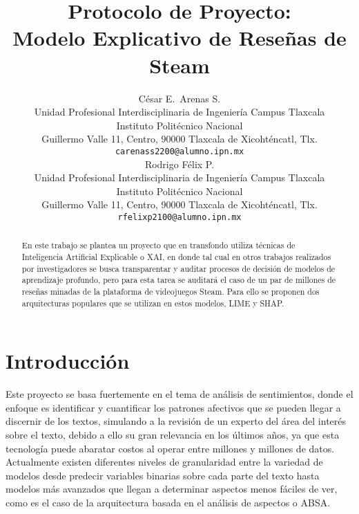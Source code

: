 \documentclass{article}
\title{Protocolo de Proyecto: \\ Modelo Explicativo de Reseñas de Steam}
\author{
  César E.~Arenas S. \\
  Unidad Profesional Interdisciplinaria de Ingeniería Campus Tlaxcala\\
  Instituto Politécnico Nacional\\
  Guillermo Valle 11, Centro, 90000 Tlaxcala de Xicohténcatl, Tlx. \\
  \texttt{carenass2200@alumno.ipn.mx} \\
  \And
  Rodrigo Félix P. \\
  Unidad Profesional Interdisciplinaria de Ingeniería Campus Tlaxcala\\
  Instituto Politécnico Nacional \\
  Guillermo Valle 11, Centro, 90000 Tlaxcala de Xicohténcatl, Tlx. \\
  \texttt{rfelixp2100@alumno.ipn.mx} \\
}
\begin{document}
\maketitle


\begin{abstract}

  En este trabajo se plantea un proyecto que en transfondo utiliza técnicas de Inteligencia Artificial Explicable o XAI, en donde tal cual en otros trabajos realizados por investigadores se busca transparentar y auditar procesos de decisión de modelos de aprendizaje profundo, pero para esta tarea se auditará el caso de un par de millones de reseñas minadas de la plataforma de videojuegos Steam. Para ello se proponen dos arquitecturas populares que se utilizan en estos modelos, LIME y SHAP.
\end{abstract}


\section{Introducción}

Este proyecto se basa fuertemente en el tema de análisis de sentimientos, donde el enfoque es identificar y cuantificar los patrones afectivos que se pueden llegar a discernir de los textos, simulando a la revisión de un experto del área del interés sobre el texto, debido a ello su gran relevancia en los últimos años, ya que esta tecnología puede abaratar costos al operar entre millones y millones de datos. Actualmente existen diferentes niveles de granularidad entre la variedad de modelos desde predecir variables binarias sobre cada parte del texto hasta modelos más avanzados que llegan a determinar aspectos menos fáciles de ver, como es el caso de la arquitectura basada en el análisis de aspectos o ABSA. 
\end{document}
